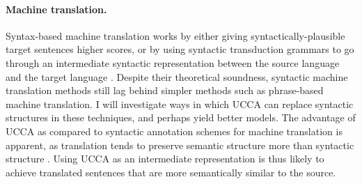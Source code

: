 \documentclass[12pt]{article}
\begin{document}
\paragraph{Machine translation.}
Syntax-based machine translation works by either giving syntactically-plausible target sentences higher scores,
or by using syntactic transduction grammars to go through an intermediate syntactic representation between
the source language and the target language \cite{nadejde2013edinburgh}.
Despite their theoretical soundness, syntactic machine translation methods still lag behind simpler methods
such as phrase-based machine translation.
I will investigate ways in which UCCA can replace syntactic structures in these techniques, and perhaps
yield better models.
The advantage of UCCA as compared to syntactic annotation schemes for machine translation is apparent,
as translation tends to preserve semantic structure more than syntactic structure \cite{sulem2015conceptual}.
Using UCCA as an intermediate representation is thus likely to achieve translated sentences that are more
semantically similar to the source.





\end{document}
